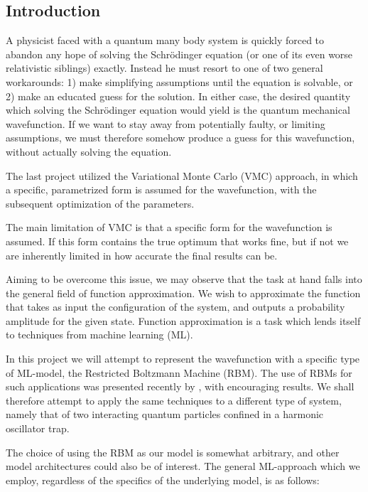 \documentclass[a4paper, 11pt]{article}
\begin{document}
\begin{multicols}{2}    

    \section{Introduction} 

    A physicist faced with a quantum many body system is quickly forced to
    abandon any hope of solving the Schrödinger equation (or one of its even worse
    relativistic siblings) exactly. Instead he must resort to one of two general
    workarounds: 1) make simplifying assumptions until the equation is solvable,
    or 2) make an educated guess for the solution. In either case, the desired
    quantity which solving the Schrödinger equation would yield is the quantum
    mechanical wavefunction. If we want to stay away from potentially faulty, or
    limiting assumptions, we must therefore somehow produce a guess for this
    wavefunction, without actually solving the equation.

    The last project utilized the Variational Monte Carlo (VMC) approach, in which a
    specific, parametrized form is assumed for the wavefunction, with the
    subsequent optimization of the parameters.

    The main limitation of VMC is that a specific form for the wavefunction is
    assumed. If this form contains the true optimum that works fine, but if not
    we are inherently limited in how accurate the final results can be.

    Aiming to be overcome this issue, we may observe that the task at hand falls
    into the general field of function approximation. We wish to approximate the
    function that takes as input the configuration of the system, and outputs a
    probability amplitude for the given state. Function approximation is a task
    which lends itself to techniques from machine learning (ML). 

    In this project we will attempt to represent the wavefunction with a
    specific type of ML-model, the Restricted Boltzmann Machine (RBM). The use
    of RBMs for such applications was presented recently by
    \textcite{Carleo602}, with encouraging results. We shall therefore attempt
    to apply the same techniques to a different type of system, namely that of
    two interacting quantum particles confined in a harmonic oscillator trap.

    The choice of using the RBM as our model is somewhat arbitrary, and other
    model architectures could also be of interest. The general ML-approach which
    we employ, regardless of the specifics of the underlying model, is as follows:


\end{multicols}
\end{document}
